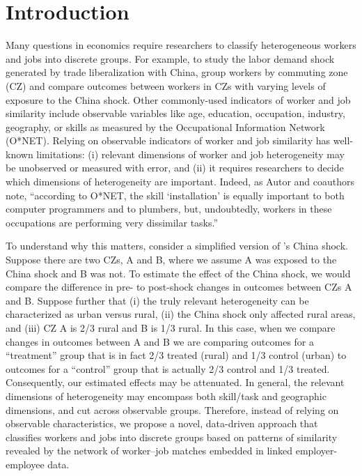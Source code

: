 \documentclass[12pt]{article}
\theoremstyle{definition}
\theoremstyle{plain}
\begin{document}


\clearpage

\onehalfspacing
\section{Introduction}

Many questions in economics require researchers to classify heterogeneous workers and jobs into discrete groups. For example, to study the labor demand shock generated by trade liberalization with China, \citet{AutorDornHanson2013} group workers by commuting zone (CZ) and compare outcomes between workers in CZs with varying levels of exposure to the China shock. Other commonly-used indicators of worker and job similarity include observable variables like age, education, occupation, industry, geography, or skills as measured by the Occupational Information Network (O*NET). Relying on observable indicators of worker and job similarity has well-known limitations: (i) relevant dimensions of worker and job heterogeneity may be unobserved or measured with error, and (ii) it requires researchers to decide which dimensions of heterogeneity are important. Indeed, as Autor and coauthors note, ``according to O*NET, the skill `installation' is equally important to both computer programmers and to plumbers, but, undoubtedly, workers in these occupations are performing very dissimilar tasks.''  \citep{FrankAutorBessenBrynjolfssonCebrianDemingFeldmanGrohLoboMoro2019}

To understand why this matters, consider a simplified version of \citet{AutorDornHanson2013}'s China shock. Suppose there are two CZs, A and B, where we assume A was exposed to the China shock and B was not. To estimate the effect of the China shock, we would compare the difference in pre- to post-shock changes in outcomes between CZs A and B. Suppose further that (i) the truly relevant heterogeneity can be characterized as urban versus rural, (ii) the China shock only affected rural areas, and (iii)  CZ A is 2/3 rural and B is 1/3 rural. In this case, when we compare changes in outcomes between A and B we are comparing outcomes for a ``treatment'' group that is in fact 2/3 treated (rural) and 1/3 control (urban) to outcomes for a ``control'' group that is actually 2/3 control and 1/3 treated. Consequently, our estimated effects may be attenuated. In general, the relevant dimensions of heterogeneity may encompass both skill/task and geographic dimensions, and cut across observable groups. Therefore, instead of relying on observable characteristics, we propose a novel, data-driven approach that classifies workers and jobs into discrete groups based on patterns of similarity revealed by the network of worker--job matches embedded in linked employer-employee data. 
\end{document}
